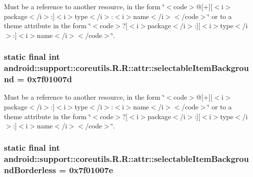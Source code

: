 Must be a reference to another resource, in the form \char`\"{}$<$code$>$@\mbox{[}+\mbox{]}\mbox{[}$<$i$>$package$<$/i$>$:\mbox{]}$<$i$>$type$<$/i$>$:$<$i$>$name$<$/i$>$$<$/code$>$\char`\"{} or to a theme attribute in the form \char`\"{}$<$code$>$?\mbox{[}$<$i$>$package$<$/i$>$:\mbox{]}\mbox{[}$<$i$>$type$<$/i$>$:\mbox{]}$<$i$>$name$<$/i$>$$<$/code$>$\char`\"{}. \hypertarget{classandroid_1_1support_1_1coreutils_1_1_r_1_1attr_09f610d0106e2298656889943e3817a7}{
\subsubsection[{selectableItemBackground}]{\setlength{\rightskip}{0pt plus 5cm}static final int android::support::coreutils.R.R::attr::selectableItemBackground = 0x7f01007d}}
\label{classandroid_1_1support_1_1coreutils_1_1_r_1_1attr_09f610d0106e2298656889943e3817a7}


Must be a reference to another resource, in the form \char`\"{}$<$code$>$@\mbox{[}+\mbox{]}\mbox{[}$<$i$>$package$<$/i$>$:\mbox{]}$<$i$>$type$<$/i$>$:$<$i$>$name$<$/i$>$$<$/code$>$\char`\"{} or to a theme attribute in the form \char`\"{}$<$code$>$?\mbox{[}$<$i$>$package$<$/i$>$:\mbox{]}\mbox{[}$<$i$>$type$<$/i$>$:\mbox{]}$<$i$>$name$<$/i$>$$<$/code$>$\char`\"{}. \hypertarget{classandroid_1_1support_1_1coreutils_1_1_r_1_1attr_91e94b0b62a24493abf74e86fb2b2312}{
\subsubsection[{selectableItemBackgroundBorderless}]{\setlength{\rightskip}{0pt plus 5cm}static final int android::support::coreutils.R.R::attr::selectableItemBackgroundBorderless = 0x7f01007e}}
\label{classandroid_1_1support_1_1coreutils_1_1_r_1_1attr_91e94b0b62a24493abf74e86fb2b2312}


